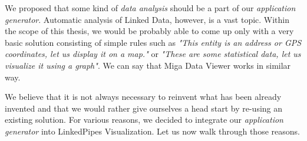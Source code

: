 We proposed that some kind of \emph{data analysis} should be a part of our \emph{application generator}. Automatic analysis of Linked Data, however, is a vast topic. Within the scope of this thesis, we would be probably able to come up only with a very basic solution consisting of simple rules such as  \textit{"This entity is an address or GPS coordinates, let us display it on a map."} or \textit{"These are some statistical data, let us visualize it using a graph"}. We can say that Miga Data Viewer works in similar way.

We believe that it is not always necessary to reinvent what has been already invented and that we would rather give ourselves a head start by re-using an existing solution. For various reasons, we decided to integrate our \emph{application generator} into LinkedPipes Visualization. Let us now walk through those reasons.

